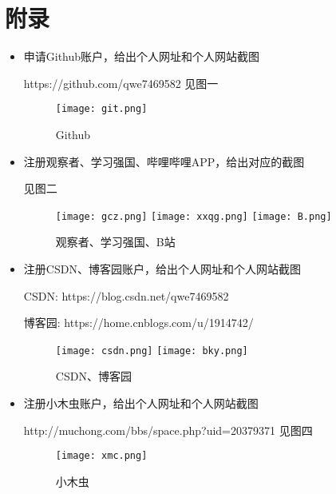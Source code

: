 \documentclass{article}
\begin{document}
\section{附录}
\begin{itemize}
    \item 申请Github账户，给出个人网址和个人网站截图
    
https://github.com/qwe7469582	见图一
\begin{figure}[H]
	\centering
	{
		\texttt{[image: git.png]}}
	\hspace{0in}    %
	\caption{Github}
\end{figure}
    \item 注册观察者、学习强国、哔哩哔哩APP，给出对应的截图
    
    见图二
\begin{figure}[H]
	\centering
	{
		\texttt{[image: gcz.png]}}
	\hspace{0in}    %
	{
		\texttt{[image: xxqg.png]}}
	\hspace{0in}
	{
		\texttt{[image: B.png]}}
	\hspace{0in}

	\caption{观察者、学习强国、B站}
\end{figure}
    \item 注册CSDN、博客园账户，给出个人网址和个人网站截图
    
    CSDN:  https://blog.csdn.net/qwe7469582
    
    博客园:  https://home.cnblogs.com/u/1914742/
    
    \begin{figure}[H]
    	\centering
    	{
    		\texttt{[image: csdn.png]}}
    	\hspace{0in}    %
    	{
    		\texttt{[image: bky.png]}}
    	\hspace{0in}
    	
    	\caption{CSDN、博客园}
    \end{figure}
    \item 注册小木虫账户，给出个人网址和个人网站截图
    
    http://muchong.com/bbs/space.php?uid=20379371 见图四
    
    \begin{figure}[H]
    	\centering
    	{
    		\texttt{[image: xmc.png]}}

    	
    	\caption{小木虫}
    \end{figure}
\end{itemize}
\end{document}
